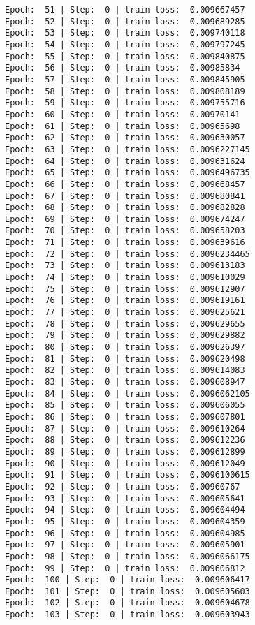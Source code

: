 \documentclass[11pt]{article}
\begin{document}
\begin{Verbatim}[commandchars=\\\{\}]
Epoch:  51 | Step:  0 | train loss:  0.009667457
Epoch:  52 | Step:  0 | train loss:  0.009689285
Epoch:  53 | Step:  0 | train loss:  0.009740118
Epoch:  54 | Step:  0 | train loss:  0.009797245
Epoch:  55 | Step:  0 | train loss:  0.009840875
Epoch:  56 | Step:  0 | train loss:  0.00985834
Epoch:  57 | Step:  0 | train loss:  0.009845905
Epoch:  58 | Step:  0 | train loss:  0.009808189
Epoch:  59 | Step:  0 | train loss:  0.009755716
Epoch:  60 | Step:  0 | train loss:  0.00970141
Epoch:  61 | Step:  0 | train loss:  0.00965698
Epoch:  62 | Step:  0 | train loss:  0.009630057
Epoch:  63 | Step:  0 | train loss:  0.0096227145
Epoch:  64 | Step:  0 | train loss:  0.009631624
Epoch:  65 | Step:  0 | train loss:  0.0096496735
Epoch:  66 | Step:  0 | train loss:  0.009668457
Epoch:  67 | Step:  0 | train loss:  0.009680841
Epoch:  68 | Step:  0 | train loss:  0.009682828
Epoch:  69 | Step:  0 | train loss:  0.009674247
Epoch:  70 | Step:  0 | train loss:  0.009658203
Epoch:  71 | Step:  0 | train loss:  0.009639616
Epoch:  72 | Step:  0 | train loss:  0.0096234465
Epoch:  73 | Step:  0 | train loss:  0.009613183
Epoch:  74 | Step:  0 | train loss:  0.009610029
Epoch:  75 | Step:  0 | train loss:  0.009612907
Epoch:  76 | Step:  0 | train loss:  0.009619161
Epoch:  77 | Step:  0 | train loss:  0.009625621
Epoch:  78 | Step:  0 | train loss:  0.009629655
Epoch:  79 | Step:  0 | train loss:  0.009629882
Epoch:  80 | Step:  0 | train loss:  0.009626397
Epoch:  81 | Step:  0 | train loss:  0.009620498
Epoch:  82 | Step:  0 | train loss:  0.009614083
Epoch:  83 | Step:  0 | train loss:  0.009608947
Epoch:  84 | Step:  0 | train loss:  0.0096062105
Epoch:  85 | Step:  0 | train loss:  0.009606055
Epoch:  86 | Step:  0 | train loss:  0.009607801
Epoch:  87 | Step:  0 | train loss:  0.009610264
Epoch:  88 | Step:  0 | train loss:  0.009612236
Epoch:  89 | Step:  0 | train loss:  0.009612899
Epoch:  90 | Step:  0 | train loss:  0.009612049
Epoch:  91 | Step:  0 | train loss:  0.0096100615
Epoch:  92 | Step:  0 | train loss:  0.00960767
Epoch:  93 | Step:  0 | train loss:  0.009605641
Epoch:  94 | Step:  0 | train loss:  0.009604494
Epoch:  95 | Step:  0 | train loss:  0.009604359
Epoch:  96 | Step:  0 | train loss:  0.009604985
Epoch:  97 | Step:  0 | train loss:  0.009605901
Epoch:  98 | Step:  0 | train loss:  0.0096066175
Epoch:  99 | Step:  0 | train loss:  0.009606812
Epoch:  100 | Step:  0 | train loss:  0.009606417
Epoch:  101 | Step:  0 | train loss:  0.009605603
Epoch:  102 | Step:  0 | train loss:  0.009604678
Epoch:  103 | Step:  0 | train loss:  0.009603943

\end{Verbatim}
\end{document}
